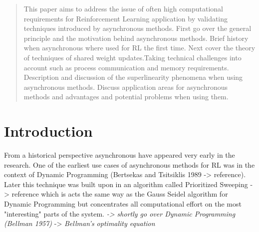
    \date{Received: date / Accepted: date}


    \maketitle

    \begin{abstract}
        
        This paper aims to address the issue of often high computational requirements for Reinforcement Learning application by validating techniques introduced by asynchronous methods.
        First go over the general principle and the motivation behind asynchronous methods. Brief history when asynchronous where used for RL the first time. Next cover the theory of techniques of shared weight updates.Taking technical challenges into account such as process communication and memory requirements.  Description and discussion of the superlinearity phenomena when using asynchronous methods. Discuss application areas for asynchronous methods and advantages and potential problems when using them.
        
    \end{abstract}


    \section{Introduction}
    \label{intro}
    From a historical perspective asynchronous have appeared very early in the research. One of the earliest use cases of asynchronous methods for RL was in the context of Dynamic Programming (Bertsekas and Tsitsiklis 1989 -> reference).
    Later this technique was built upon in an algorithm called Prioritized Sweeping  -> reference which is acts the same way as the Gauss Seidel algorithm for Dynamic Programming but concentrates all computational effort on the most "interesting" parts of the system.
    \textit{-> shortly go over Dynamic Programming (Bellman 1957)}
    -> \textit{Bellman's optimality equation}
    
